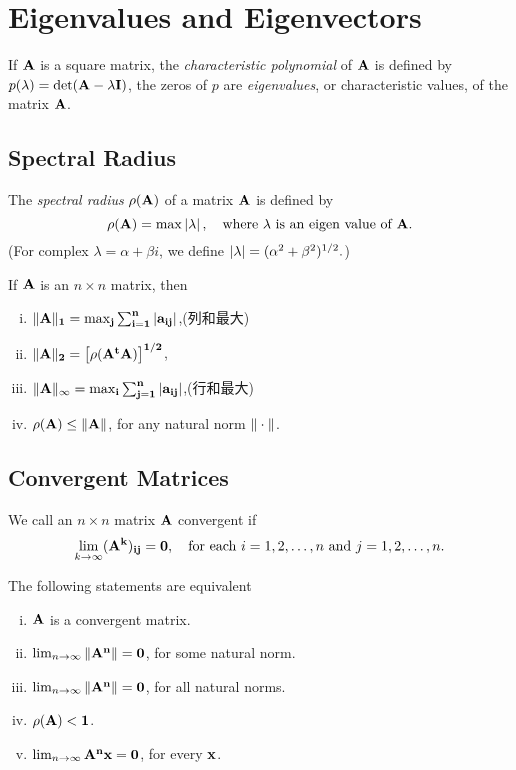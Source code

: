 \section{Eigenvalues and Eigenvectors}
If $\bf A$ is a square matrix, the \emph{characteristic polynomial} of $\bf A$ is defined by $p(\lambda)=\det(\bf A-\lambda I)$, the zeros of $p$ are \emph{eigenvalues}, or characteristic values, of the matrix $\bf A$.

\subsection{Spectral Radius}
\begin{defn}
The \emph{spectral radius} $\rho(\bf A)$ of a matrix $\bf A$ is defined by
\[
\rho(\bf A)=\max\left|\lambda\right|,\quad\text{where $\lambda$ is an eigen value of $\bf A$.}
\]
(For complex $\lambda=\alpha+\beta i$, we define $\left|\lambda\right|=(\alpha^2+\beta^2)^{1/2}.$)
\end{defn}

\begin{theo}
If $\bf A$ is an $n\times n$ matrix, then
\begin{enumerate}[(i)]
    \item $\|\bf A\|_1=\max_j\sum_{i=1}^{n}\left|a_{ij}\right|$,(列和最大)
    \item $\|\bf A\|_2=\left[\rho(A^tA)\right]^{1/2}$,
    \item $\|\bf A\|_\infty=\max_i\sum_{j=1}^{n}\left|a_{ij}\right|$,(行和最大)
    \item $\rho(\bf A)\leq\|\bf A\|$, for any natural norm $\|\cdot\|$.
\end{enumerate}
\end{theo}

\subsection{Convergent Matrices}
\begin{defn}[Convergent]
We call an $n\times n$ matrix $\bf A$  convergent if
\[
\lim_{k\to\infty}(\bf A^k)_{ij}=0,\quad\text{for each $i=1,2,\ldots,n$ and $j=1,2,\ldots,n$.}
\]
\end{defn}

\begin{theo}
The following statements are equivalent
\begin{enumerate}[(i)]
    \item $\bf A$ is a convergent matrix.
    \item $\lim_{n\to\infty}\|\bf A^n\|=0$, for some natural norm.
    \item $\lim_{n\to\infty}\|\bf A^n\|=0$, for all natural norms.
    \item $\rho(\bf A)<1$.
    \item $\lim_{n\to\infty}\bf A^n\bf x=\bf 0$, for every $\bf x$.
\end{enumerate}
\end{theo}
